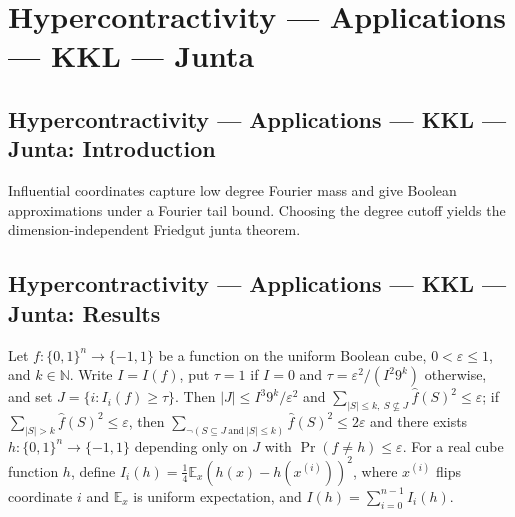\section{Hypercontractivity --- Applications --- KKL --- Junta}
\subsection*{Hypercontractivity --- Applications --- KKL --- Junta: Introduction}
Influential coordinates capture low degree Fourier mass and give Boolean approximations under a Fourier tail bound. Choosing the degree cutoff yields the dimension-independent Friedgut junta theorem.

\subsection*{Hypercontractivity --- Applications --- KKL --- Junta: Results}

\begin{theorem}
\leanok
{}
Let $f:\{0,1\}^n\to\{-1,1\}$ be a function on the uniform Boolean cube, $0<\varepsilon\le1$, and $k\in\mathbb N$. Write $I=I(f)$, put $\tau=1$ if $I=0$ and $\tau=\varepsilon^2/(I^2 9^k)$ otherwise, and set $J=\{i:I_i(f)\ge\tau\}$. Then $|J|\le I^3 9^k/\varepsilon^2$ and $\sum_{|S|\le k,\ S\nsubseteq J}\widehat f(S)^2\le\varepsilon$; if $\sum_{|S|>k}\widehat f(S)^2\le\varepsilon$, then $\sum_{\neg(S\subseteq J\ \mathrm{and}\ |S|\le k)}\widehat f(S)^2\le2\varepsilon$ and there exists $h:\{0,1\}^n\to\{-1,1\}$ depending only on $J$ with $\Pr(f\ne h)\le\varepsilon$. For a real cube function $h$, define $I_i(h)=\tfrac14\mathbb E_x(h(x)-h(x^{(i)}))^2$, where $x^{(i)}$ flips coordinate $i$ and $\mathbb E_x$ is uniform expectation, and $I(h)=\sum_{i=0}^{n-1}I_i(h)$.
\end{theorem}

